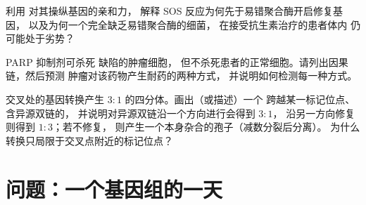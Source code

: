 \begin{exercise}[$\star\star\star$]\label{exo:b3:dna-repair:10}
利用  对其操纵基因的亲和力，
解释 SOS 反应为何先于易错聚合酶开启修复基因，
以及为何一个完全缺乏易错聚合酶的细菌，
在接受抗生素治疗的患者体内
仍可能处于劣势？
\end{exercise}

\begin{exercise}[$\star\star\star$]\label{exo:b3:dna-repair:11}
PARP 抑制剂可杀死 \emph{} 缺陷的肿瘤细胞，
但不杀死患者的正常细胞。请列出因果链，然后预测
肿瘤对该药物产生耐药的两种方式，
并说明如何检测每一种方式。
\end{exercise}

\begin{exercise}[$\star\star\star$]\label{exo:b3:dna-repair:12}
交叉处的基因转换产生 $3{:}1$ 的四分体。画出（或描述）一个
跨越某一标记位点、含异源双链的，
并说明对异源双链沿一个方向进行会得到 $3{:}1$，
沿另一方向修复则得到 $1{:}3$；若不修复，
则产生一个本身杂合的孢子（减数分裂后分离）。
为什么转换只局限于交叉点附近的标记位点？
\end{exercise}

\section{问题：一个基因组的一天}


